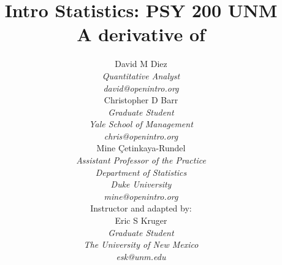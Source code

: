 \title{\huge Intro Statistics: PSY 200 UNM\vspace{1.5mm} \\ \Large A derivative of }
\author{David M Diez \\
\small\emph{Quantitative Analyst} \\
\vspace{6mm}%
\small\emph{david@openintro.org} \\
Christopher D Barr \\
\small\emph{Graduate Student} \\
\small\emph{Yale School of Management} \\
\vspace{6mm}%
\small\emph{chris@openintro.org} \\
Mine \c{C}etinkaya-Rundel \\
\small\emph{Assistant Professor of the Practice} \\
\small\emph{Department of Statistics} \\
\small\emph{Duke University} \\
\vspace{6mm}%
\small\emph{mine@openintro.org} \\
Instructor and adapted by: \\
Eric S Kruger \\
\small\emph{Graduate Student} \\
\small\emph{The University of New Mexico} \\
\vspace{6mm}%
\small\emph{esk@unm.edu}}
